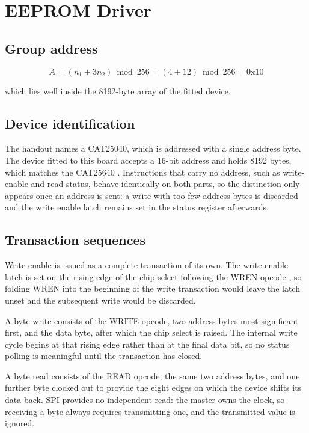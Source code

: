 \documentclass[conference]{IEEEtran}
\begin{document}
\section{EEPROM Driver}

\subsection{Group address}

\[ A = (n_1 + 3n_2) \bmod 256 = (4 + 12) \bmod 256 = \text{0x10} \]

which lies well inside the 8192-byte array of the fitted device.

\subsection{Device identification}

The handout names a CAT25040, which is addressed with a single address byte.
The device fitted to this board accepts a 16-bit address and holds 8192 bytes,
which matches the CAT25640 \cite{cat25640}. Instructions that carry no address,
such as write-enable and read-status, behave identically on both parts, so the
distinction only appears once an address is sent: a write with too few address
bytes is discarded and the write enable latch remains set in the status
register afterwards. \mAddressWidth

\subsection{Transaction sequences}

Write-enable is issued as a complete transaction of its own. The write enable
latch is set on the rising edge of the chip select following the WREN opcode
\cite{cat25640}, so folding WREN into the beginning of the write transaction
would leave the latch unset and the subsequent write would be discarded.

A byte write consists of the WRITE opcode, two address bytes most significant
first, and the data byte, after which the chip select is raised. The internal
write cycle begins at that rising edge rather than at the final data bit, so no
status polling is meaningful until the transaction has closed.

A byte read consists of the READ opcode, the same two address bytes, and one
further byte clocked out to provide the eight edges on which the device shifts
its data back. SPI provides no independent read: the master owns the clock, so
receiving a byte always requires transmitting one, and the transmitted value is
ignored.
\end{document}
